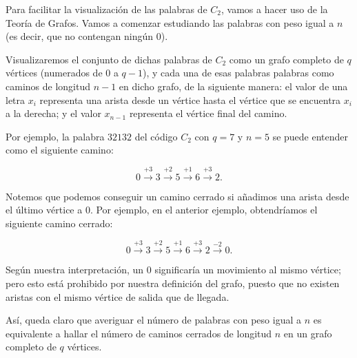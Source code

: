 \begin{enumerate}[label=\alph*)]
	Para facilitar la visualización de las palabras de $C_2$, vamos a hacer uso de la Teoría de Grafos. Vamos a comenzar estudiando las palabras con peso igual a $n$ (es decir, que no contengan ningún $0$).
	
	Visualizaremos el conjunto de dichas palabras de $C_2$ como un grafo completo de $q$ vértices (numerados de $0$ a $q-1$), y cada una de esas palabras palabras como caminos de longitud $n-1$ en dicho grafo, de la siguiente manera: el valor de una letra $x_i$ representa una arista desde un vértice hasta el vértice que se encuentra $x_i$ a la derecha; y el valor $x_{n-1}$ representa el vértice final del camino.
	
	Por ejemplo, la palabra $32132$ del código $C_2$ con $q=7$ y $n=5$ se puede entender como el siguiente camino:
	
	\begin{center}
	\end{center}
	\[0 \xrightarrow{+3} 3 \xrightarrow{+2} 5 \xrightarrow{+1} 6 \xrightarrow{+3} 2.\]
	
	Notemos que podemos conseguir un camino cerrado si añadimos una arista desde el último vértice a $0$. Por ejemplo, en el anterior ejemplo, obtendríamos el siguiente camino cerrado:
	
	\begin{center}
	\end{center}
	\[0 \xrightarrow{+3} 3 \xrightarrow{+2} 5 \xrightarrow{+1} 6 \xrightarrow{+3} 2 \xrightarrow{-2} 0.\]
	
	Según nuestra interpretación, un $0$ significaría un movimiento al mismo vértice; pero esto está prohibido por nuestra definición del grafo, puesto que no existen aristas con el mismo vértice de salida que de llegada.
	
	Así, queda claro que averiguar el número de palabras con peso igual a $n$ es equivalente a hallar el número de caminos cerrados de longitud $n$ en un grafo completo de $q$ vértices.
	

\end{enumerate}
